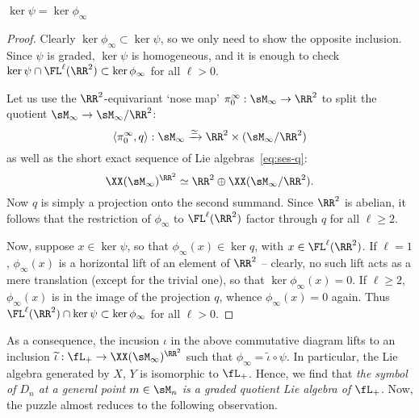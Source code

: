 \begin{lem*}
        $\ker\psi = \ker\phi_\infty$
\end{lem*}
\begin{proof}
        Clearly $\ker\phi_\infty \subset \ker\psi$, so we only need
        to show the opposite inclusion. Since $\psi$ is graded, $\ker\psi$ is homogeneous,
        and it is enough to check $\ker\psi \cap \FL^\ell(\RR^2) \subset \ker\phi_\infty$ for all $\ell>0$.

Let us use the $\RR^2$-equivariant `nose map' $\pi^\infty_0 : \sM_\infty \to \RR^2$ to split the quotient
 $\sM_\infty \to \sM_\infty/\RR^2$:
\[ \langle \pi^\infty_0,q\rangle : \sM_\infty \xrightarrow{\simeq} \RR^2 \times (\sM_\infty/\RR^2) \]
as well as the  short exact sequence of Lie algebras~\eqref{eq:ses-q}:
\[ \XX(\sM_\infty)^{\RR^2} \simeq \RR^2 \oplus \XX(\sM_\infty/\RR^2). \]
Now $q$ is simply a projection onto the second summand.
Since $\RR^2$ is abelian, it follows that
the restriction of $\phi_\infty$ to $\FL^\ell(\RR^2)$ factor through $q$ 
for all $\ell \ge 2$.

Now, suppose $x \in \ker\psi$, so that $\phi_\infty(x) \in \ker q$, with $x \in \FL^\ell(\RR^2)$.
If $\ell=1$, $\phi_\infty(x)$ is a horizontal lift of an element of $\RR^2$ -- clearly, no such lift
acts as a mere translation (except for the trivial one), so that $\ker\phi_\infty(x)=0$. If $\ell\ge2$, 
$\phi_\infty(x)$ is in the image of the projection $q$, whence $\phi_\infty(x)=0$ again. Thus
$\FL^\ell(\RR^2) \cap \ker\psi \subset \ker\phi_\infty$ for all $\ell>0$.
\end{proof}

As a consequence, the incusion $\iota$ in the above commutative diagram
lifts to an inclusion $\widetilde\iota : \fL_+ \to \XX(\sM_\infty)^{\RR^2}$  such that
$\phi_\infty = \widetilde\iota \circ \psi$. In particular, the Lie algebra generated
by $X$, $Y$ is isomorphic to $\fL_+$.
Hence, we find
that \emph{the symbol of $D_n$ at a general point $m \in \sM_n$ is a graded quotient Lie algebra of 
$\fL_+$}. Now, the puzzle almost reduces to the following observation.

